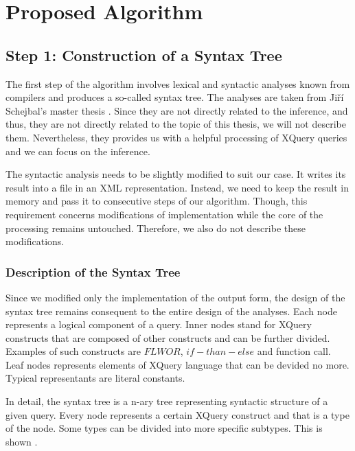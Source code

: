 \chapter{Proposed Algorithm}

\section{Step 1: Construction of a Syntax Tree}
The first step of the algorithm involves lexical and syntactic analyses known from compilers and produces a so-called syntax tree. The analyses are taken from Ji\v r\'{i} Schejbal's master thesis . Since they are not directly related to the inference, and thus, they are not directly related to the topic of this thesis, we will not describe them. Nevertheless, they provides us with a helpful processing of XQuery queries and we can focus on the inference.

The syntactic analysis needs to be slightly modified to suit our case. It writes its result into a file in an XML representation. Instead, we need to keep the result in memory and pass it to consecutive steps of our algorithm. Though, this requirement concerns modifications of implementation while the core of the processing remains untouched. Therefore, we also do not describe these modifications.

\subsection{Description of the Syntax Tree}
Since we modified only the implementation of the output form, the design of the syntax tree remains consequent to the entire design of the analyses. Each node represents a logical component of a query. Inner nodes stand for XQuery constructs that are composed of other constructs and can be further divided. Examples of such constructs are $FLWOR$, $if-than-else$ and function call. Leaf nodes represents elements of XQuery language that can be devided no more. Typical representants are literal constants. 

In detail, the syntax tree is a n-ary tree representing syntactic structure of a given query. Every node represents a certain XQuery construct and that is a type of the node. Some types can be divided into more specific subtypes. This is shown .

